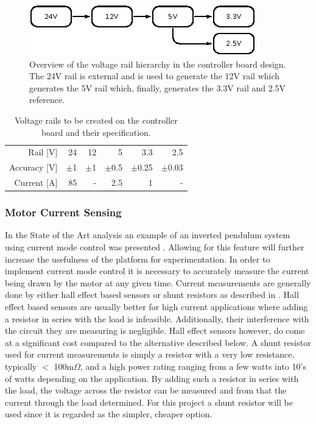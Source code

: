 \begin{figure}[h]
	\centering
	\includegraphics[width=.75\linewidth]{graphics/rail_hierarchy}
	\caption[Voltage rail hierarchy on the controller board.]{Overview of the voltage rail hierarchy in the controller board design. The 24V rail is external and is used to generate the 12V rail which generates the 5V rail which, finally, generates the 3.3V rail and 2.5V reference.}
	\label{fig:voltage_hierarchy}
\end{figure}

\begin{table}[h]
	\centering
	\begin{tabular}{r | r | r | r | r | r}
		Rail [V] & 24 & 12 & 5 & 3.3 & 2.5\\
		Accuracy [V] & $\pm$1 & $\pm$1 & $\pm$0.5 & $\pm$0.25 & $\pm$0.03\\
		Current [A] & 85 & - & 2.5 & 1 & -
	\end{tabular}
	\caption[Voltage rails to be created on the controller board]{Voltage rails to be created on the controller board and their specification.}
	\label{tab:powerrails}
\end{table}

\subsubsection{Motor Current Sensing}
In the State of the Art analysis an example of an inverted pendulum system using current mode control was presented \cite{invertpendulum1}.
Allowing for this feature will further increase the usefulness of the platform for experimentation.
In order to implement current mode control it is necessary to accurately measure the current being drawn by the motor at any given time.
Current measurements are generally done by either hall effect based sensors or shunt resistors as described in \cite{current_measure_vishay}.
Hall effect based sensors are usually better for high current applications where adding a resistor in series with the load is infeasible. 
Additionally, their interference with the circuit they are measuring is negligible.
Hall effect sensors however, do come at a significant cost compared to the alternative described below.
A shunt resistor used for current measurements is simply a resistor with a very low resistance, typically $<$ 100m$\Omega$, and a high power rating ranging from a few watts into 10's of watts depending on the application.
By adding such a resistor in series with the load, the voltage across the resistor can be measured and from that the current through the load determined.
For this project a shunt resistor will be used since it is regarded as the simpler, cheaper option.

